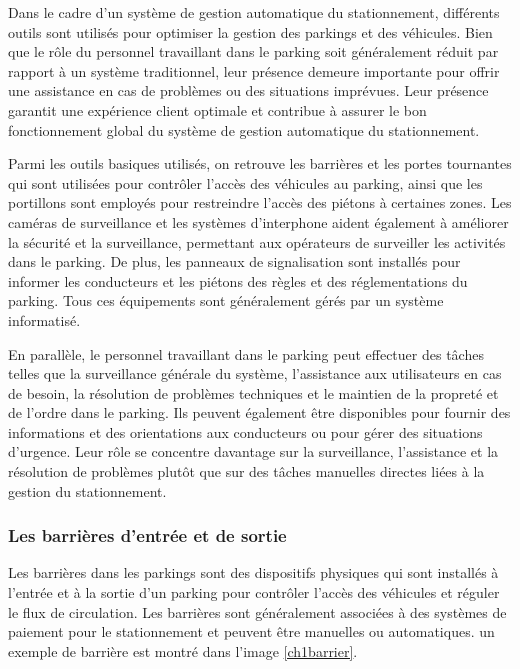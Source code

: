 Dans le cadre d'un système de gestion automatique du stationnement, différents outils sont utilisés pour optimiser la gestion des parkings et des véhicules. Bien que le rôle du personnel travaillant dans le parking soit généralement réduit par rapport à un système traditionnel, leur présence demeure importante pour offrir une assistance en cas de problèmes ou des situations imprévues. Leur présence garantit une expérience client optimale et contribue à assurer le bon fonctionnement global du système de gestion automatique du stationnement.

Parmi les outils basiques utilisés, on retrouve les barrières et les portes tournantes qui sont utilisées pour contrôler l'accès des véhicules au parking, ainsi que les portillons sont employés pour restreindre l'accès des piétons à certaines zones. Les caméras de surveillance et les systèmes d'interphone aident également à améliorer la sécurité et la surveillance, permettant aux opérateurs de surveiller les activités dans le parking. De plus, les panneaux de signalisation sont installés pour informer les conducteurs et les piétons des règles et des réglementations du parking. Tous ces équipements sont généralement gérés par un système informatisé.

En parallèle, le personnel travaillant dans le parking peut effectuer des tâches telles que la surveillance générale du système, l'assistance aux utilisateurs en cas de besoin, la résolution de problèmes techniques et le maintien de la propreté et de l'ordre dans le parking. Ils peuvent également être disponibles pour fournir des informations et des orientations aux conducteurs ou pour gérer des situations d'urgence. Leur rôle se concentre davantage sur la surveillance, l'assistance et la résolution de problèmes plutôt que sur des tâches manuelles directes liées à la gestion du stationnement.

\subsubsection{ Les barrières d'entrée et de sortie}
Les barrières dans les parkings sont des dispositifs physiques qui sont installés à l'entrée et à la sortie d'un parking pour contrôler l'accès des véhicules et réguler le flux de circulation. Les barrières sont généralement associées à des systèmes de paiement pour le stationnement et peuvent être manuelles ou automatiques. un exemple de barrière est montré dans l'image \ref{ch1barrier}.

